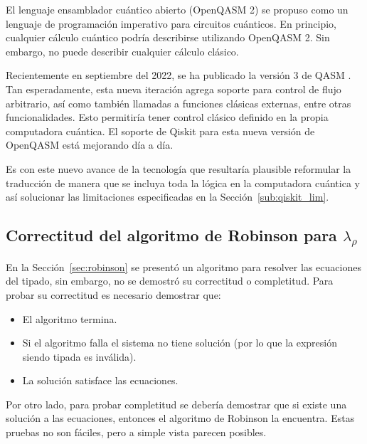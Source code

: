 El lenguaje ensamblador cuántico abierto (OpenQASM 2) se propuso como un lenguaje de programación imperativo para circuitos cuánticos. En principio, cualquier cálculo cuántico podría describirse utilizando OpenQASM 2. Sin embargo, no puede describir cualquier cálculo clásico.


Recientemente en septiembre del 2022, se ha publicado la versión 3 de QASM \cite{qasm3}. Tan esperadamente, esta nueva iteración agrega soporte para control de flujo arbitrario, así como también llamadas a funciones clásicas externas, entre otras funcionalidades. Esto permitiría tener control clásico definido en la propia computadora cuántica. El soporte de Qiskit para esta nueva versión de OpenQASM está mejorando día a día.

Es con este nuevo avance de la tecnología que resultaría plausible reformular la traducción de manera que se incluya toda la lógica en la computadora cuántica y así solucionar las limitaciones especificadas en la Sección~\ref{sub:qiskit_lim}.

\subsection{\texorpdfstring{Correctitud del algoritmo de Robinson para $\lambda_\rho$}{Correctitud del algoritmo de Robinson para Lambda Rho}}\label{sec:robinson_proof}
En la Sección~\ref{sec:robinson} se presentó un algoritmo para resolver las ecuaciones del tipado, sin embargo, no se demostró su correctitud o completitud. Para probar su correctitud es necesario demostrar que:
\begin{itemize}
    \item El algoritmo termina.
    \item Si el algoritmo falla el sistema no tiene solución (por lo que la expresión siendo tipada es inválida).
    \item La solución satisface las ecuaciones.
\end{itemize}

Por otro lado, para probar completitud se debería demostrar que si existe una solución a las ecuaciones, entonces el algoritmo de Robinson la encuentra. Estas pruebas no son fáciles, pero a simple vista parecen posibles.




